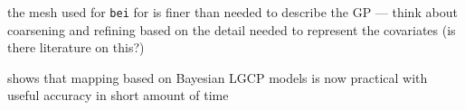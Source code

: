 \documentclass[]{interact}
\begin{document}
the mesh used for \texttt{bei} for is finer than needed to describe the
GP --- think about coarsening and refining based on the detail needed to
represent the covariates (is there literature on this?)

shows that mapping based on Bayesian LGCP models is now practical with
useful accuracy in short amount of time









\end{document}
